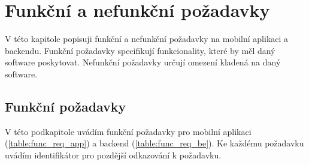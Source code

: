\chapter{Funkční a nefunkční požadavky}

\setcounter{page}{1}

\begin{chapterabstract}
	V této kapitole popisuji funkční a nefunkční požadavky na mobilní aplikaci a backendu. Funkční požadavky specifikují funkcionality, které by měl daný software poskytovat. Nefunkční požadavky určují omezení kladená na daný software. \cite{Kopka2004}
\end{chapterabstract}

\section{Funkční požadavky}
V této podkapitole uvádím funkční požadavky pro mobilní aplikaci (\ref{table:func_req_app}) a backend (\ref{table:func_req_be}). Ke každému požadavku uvádím identifikátor pro pozdější odkazování k požadavku.

